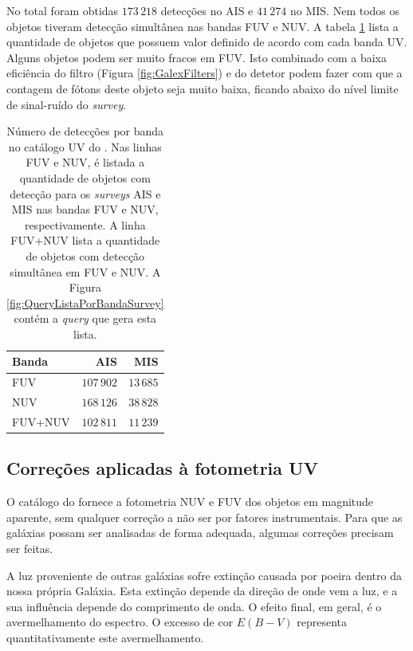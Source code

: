 No total foram obtidas $173\,218$ detecções no AIS e $41\,274$ no MIS. Nem todos
os objetos tiveram detecção simultânea nas bandas FUV e NUV. A tabela
\ref{tab:DetBanda} lista a quantidade de objetos que possuem valor definido de
acordo com cada banda UV. Alguns objetos podem ser muito fracos em FUV. Isto
combinado com a baixa eficiência do filtro (Figura \ref{fig:GalexFilters}) e do
detetor podem fazer com que a contagem de fótons deste objeto seja muito baixa,
ficando abaixo do nível limite de sinal-ruído do {\em survey}.

\begin{table}
	\caption[Número de detecções por banda no catálogo UV do \STARLIGHT.]
	{Número de detecções por banda no catálogo UV do \starlight. Nas linhas FUV e
	NUV, é listada a quantidade de objetos com detecção para os {\em
	surveys} AIS e MIS nas bandas FUV e NUV, respectivamente. A linha FUV+NUV
	lista a quantidade de objetos com detecção simultânea em FUV e NUV. A Figura
	\ref{fig:QueryListaPorBandaSurvey} contém a {\em query} que gera esta lista.}
	\setlength{\tabcolsep}{1cm}
	\begin{tabular}{l r r}
		Banda   &        AIS &       MIS \\
		\midrule
		FUV     & $107\,902$ & $13\,685$ \\
		NUV     & $168\,126$ & $38\,828$ \\
		FUV+NUV & $102\,811$ & $11\,239$ \\
	\end{tabular}
	\label{tab:DetBanda}
\end{table}

\subsection{Correções aplicadas à fotometria UV}
\label{sec:Crossmatch:DefAmostras:Correcoes}

O catálogo do \galex fornece a fotometria NUV e FUV dos objetos em magnitude
aparente, sem qualquer correção a não ser por fatores instrumentais. Para que as
galáxias possam ser analisadas de forma adequada, algumas correções precisam ser
feitas.

A luz proveniente de outras galáxias sofre extinção causada por poeira dentro da
nossa própria Galáxia. Esta extinção depende da direção de onde vem a luz, e a
sua influência depende do comprimento de onda. O efeito final, em geral, é o
avermelhamento do espectro. O excesso de cor $E(B-V)$ representa
quantitativamente este avermelhamento.

